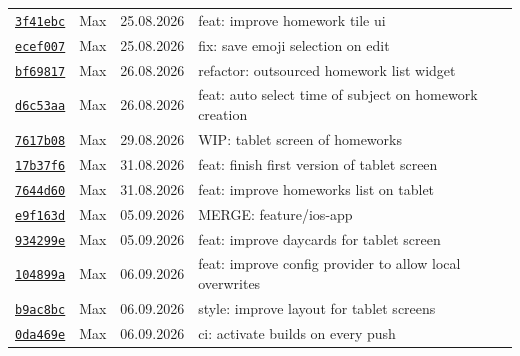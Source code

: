 \documentclass{article}%
\begin{document}
\begin{longtable}{l l l p{12cm}}
\href{https://github.com/scriptor1000/homeworks/pull/21/commits/3f41ebcb89dc694593514ed1e1159e437f32559a}{\underline{\texttt{3f41ebc}}}&Max&25.08.2026&feat: improve homework tile ui\\%
\href{https://github.com/scriptor1000/homeworks/pull/21/commits/ecef007f80323a5e5ce9c7bd981d732f46640949}{\underline{\texttt{ecef007}}}&Max&25.08.2026&fix: save emoji selection on edit\\%
\href{https://github.com/scriptor1000/homeworks/pull/21/commits/bf69817eb19be2562302db999d4d5fc5b54c4b65}{\underline{\texttt{bf69817}}}&Max&26.08.2026&refactor: outsourced homework list widget\\%
\href{https://github.com/scriptor1000/homeworks/pull/21/commits/d6c53aaeb95683fbee5164f669373cbd7a8f54c0}{\underline{\texttt{d6c53aa}}}&Max&26.08.2026&feat: auto select time of subject on homework creation\\%
\href{https://github.com/scriptor1000/homeworks/pull/21/commits/7617b089af1556f48ca19c452c3d32f01983e90f}{\underline{\texttt{7617b08}}}&Max&29.08.2026&WIP: tablet screen of homeworks\\%
\href{https://github.com/scriptor1000/homeworks/pull/21/commits/17b37f6f6331b1709c7917e8e6785ed6862bf30c}{\underline{\texttt{17b37f6}}}&Max&31.08.2026&feat: finish first version of tablet screen\\%
\href{https://github.com/scriptor1000/homeworks/pull/21/commits/7644d608a07b20da369b84cd555ac1e09c5af471}{\underline{\texttt{7644d60}}}&Max&31.08.2026&feat: improve homeworks list on tablet\\%
\href{https://github.com/scriptor1000/homeworks/pull/21/commits/e9f163d4e23996ee3cb7fc9a3308ad98f394a8fa}{\underline{\texttt{e9f163d}}}&Max&05.09.2026&MERGE: feature/ios{-}app\\%
\href{https://github.com/scriptor1000/homeworks/pull/21/commits/934299e9d819793bd9c107371237b08fb9146b04}{\underline{\texttt{934299e}}}&Max&05.09.2026&feat: improve daycards for tablet screen\\%
\href{https://github.com/scriptor1000/homeworks/pull/21/commits/104899ae7d12ce02cf75322605d3785247ca021c}{\underline{\texttt{104899a}}}&Max&06.09.2026&feat: improve config provider to allow local overwrites\\%
\href{https://github.com/scriptor1000/homeworks/pull/21/commits/b9ac8bc201e6dad723eda7c56d5cfe58fe373fa4}{\underline{\texttt{b9ac8bc}}}&Max&06.09.2026&style: improve layout for tablet screens\\%
\href{https://github.com/scriptor1000/homeworks/pull/21/commits/0da469eb0a94158cf8bfe90cc0d62eb3c7a52e30}{\underline{\texttt{0da469e}}}&Max&06.09.2026&ci: activate builds on every push\\%

\end{longtable}
\end{document}
